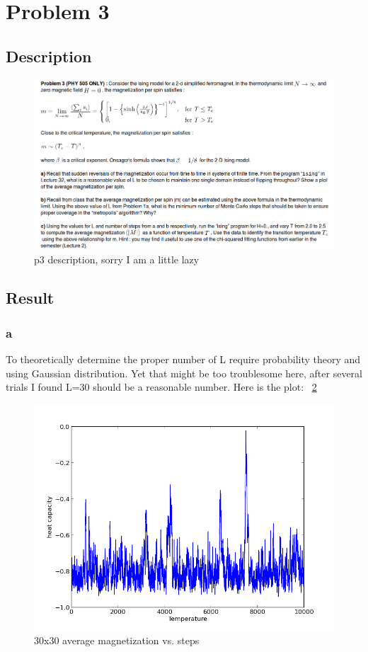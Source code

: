 \documentclass[11pt,letterpaper]{article}
\begin{document}
\section{Problem 3}
\subsection{Description}

\begin{figure}
\begin{center}
\includegraphics[width=0.8\linewidth,angle=0]{p3.png}
\caption{p3 description, sorry I am a little lazy}
\label{figure10}
\end{center}
\end{figure}


\subsection{Result}
\subsubsection{a}
To theoretically determine the proper number of L require probability theory and using Gaussian distribution. Yet that might be too troublesome here, after several trials I found L=30 should be a reasonable number. Here is the plot: ~\ref{figure11}

\begin{figure}
\begin{center}
\includegraphics[width=0.8\linewidth,angle=0]{p3a.png}
\caption{30x30 average magnetization vs. steps}
\label{figure11}
\end{center}
\end{figure}
\end{document}
